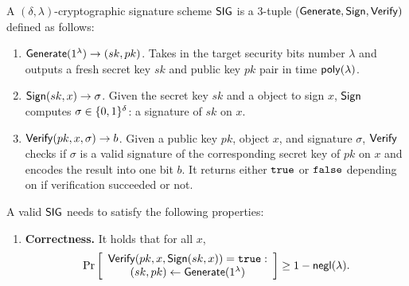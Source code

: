 \documentclass[12pt]{article}
\begin{document}
\begin{definition}\label{def:crypto_sig}

A $(\delta, \lambda)$-cryptographic signature scheme $\mathsf{SIG}$ is a 3-tuple ($\mathsf{Generate}, \mathsf{Sign}, \mathsf{Verify})$ defined as follows:
\begin{enumerate}
    \item $\mathsf{Generate}(1^{\lambda}) \to (sk, pk)$. Takes in the target security bits number $\lambda$ and outputs a fresh secret key $sk$ and public key $pk$ pair in time $\mathsf{poly}(\lambda)$.
    \item $\mathsf{Sign}(sk, x) \to \sigma$. Given the secret key $sk$ and a object to sign $x$, $\mathsf{Sign}$ computes $\sigma \in \{0,1\}^\delta$: a signature of $sk$ on $x$.
    \item $\mathsf{Verify}(pk, x, \sigma) \to b$. Given a public key $pk$, object $x$, and signature $\sigma$, $\mathsf{Verify}$ checks if $\sigma$ is a valid signature of the corresponding secret key of $pk$ on $x$ and encodes the result into one bit $b$. It returns either $\mathtt{true}$ or $\mathtt{false}$ depending on if verification succeeded or not.
\end{enumerate}

A valid $\mathsf{SIG}$ needs to satisfy the following properties:

\begin{enumerate}
    \item \textbf{Correctness.} It holds that for all $x$,
    \begin{align*}
        \Pr\left[
        \begin{array}{ccc}
            \begin{matrix}
                \mathsf{Verify}(pk, x, \mathsf{Sign}(sk, x)) = \mathtt{true}: \\
                (sk, pk) \gets \mathsf{Generate}(1^\lambda) \\
            \end{matrix} \\
        \end{array}
        \right] \geq 1 - \mathsf{negl}(\lambda).
    \end{align*}
    

\end{enumerate}
\end{definition}
\end{document}
